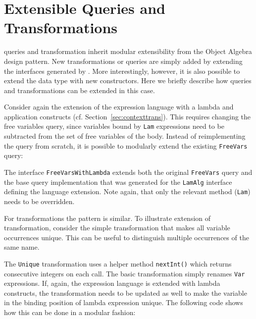

\section{Extensible Queries and Transformations}
\label{SECT:extensible}


\noindent \name queries and transformation inherit  modular extensibility from the Object Algebra design pattern.
New transformations or queries are simply added by extending the interfaces generated by \name.
More interestingly, however, it is also possible to extend the data type with new constructors.
Here we briefly describe how queries and transformations can be extended in this case.


Consider again the extension of the expression language with a lambda and application constructs (cf. Section~\ref{sec:contexttrans}).
This requires changing the free variables query, since variables bound by \lstinline{Lam} expressions need to be subtracted from the set of free variables of the body.
Instead of reimplementing the query from scratch, it is possible to modularly extend the existing \lstinline{FreeVars} query:


The interface \lstinline{FreeVarsWithLambda} extends both the original \lstinline{FreeVars} query and the base query implementation that was generated for the \lstinline{LamAlg} interface defining the language extension.
Note again, that only the relevant method (\lstinline{Lam}) needs to be overridden. 


For transformations the pattern is similar.
To illustrate extension of transformation, consider the simple transformation that makes all variable occurrences unique.
This can be useful to distinguish multiple occurrences of the same name.


The \lstinline{Unique} transformation uses a helper method \lstinline{nextInt()} which returns consecutive integers on each call.
The basic transformation simply renames \lstinline{Var} expressions.
If, again, the expression language is extended with lambda constructs, the transformation needs to be updated as well to make the variable in the binding position of lambda expression unique.
The following code shows how this can be done in a modular fashion:

